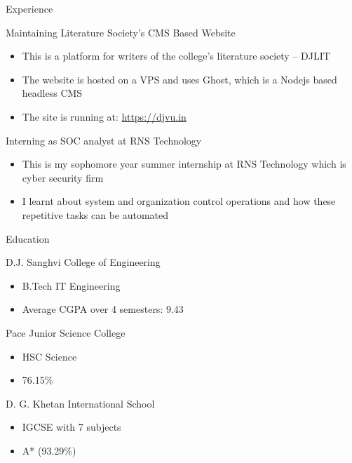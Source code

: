 \documentclass{article}
\newlength{\tabin}
\newlength{\secsep}
\newcommand{\lineunder}{\vspace*{-8pt} \\ \hspace*{-6pt} \hrulefill \\ \vspace*{-15pt}}
\newenvironment{tabbedsection}[1]{
	\begin{list}{}{
		\setlength{\itemsep}{0pt}
		\setlength{\labelsep}{0pt}
		\setlength{\labelwidth}{0pt}
		\setlength{\leftmargin}{\tabin}
		\setlength{\rightmargin}{\tabin}
		\setlength{\listparindent}{0pt}
		\setlength{\parsep}{0pt}
		\setlength{\parskip}{0pt}
		\setlength{\partopsep}{0pt}
		\setlength{\topsep}{#1}
	}
	\item[]
}{\end{list}}
\newenvironment{resume_section}[1]{
	\filbreak
	\vspace{2\secsep}
	\textsc{\large#1}
	\lineunder
	\begin{tabbedsection}{\secsep}
}{\end{tabbedsection}}
\newenvironment{resume_subsection}[2][]{
	\textbf{#2} \hfill {\footnotesize #1} \hspace{2em}
	\begin{tabbedsection}{0.5\secsep}
}{\end{tabbedsection}}
\newenvironment{subitems}{
	\renewcommand{\labelitemi}{-}
	\begin{itemize}
		\setlength{\labelsep}{1em}
}{\end{itemize}}
\begin{document}
\begin{resume_section}{Experience}

	\begin{resume_subsection}{Maintaining Literature Society's CMS Based Website}
		\begin{subitems}
			\item This is a platform for writers of the college's literature society -- DJLIT
			\item The website is hosted on a VPS and uses Ghost, which is a Nodejs based headless CMS
			\item The site is running at: \href{https://djvu.in}{https://djvu.in}
		\end{subitems}
	\end{resume_subsection}

	\begin{resume_subsection}{Interning as SOC analyst at RNS Technology}
		\begin{subitems}
			\item This is my sophomore year summer internship at RNS Technology
			      which is cyber security firm
			\item I learnt about system and organization control operations and
			      how these repetitive tasks can be automated
		\end{subitems}
	\end{resume_subsection}

\end{resume_section}

\begin{resume_section}{Education}

	\begin{resume_subsection}[2019 - 2023 (expected)]{D.J. Sanghvi College of Engineering}
		\begin{subitems}
			\item B.Tech IT Engineering
			\item Average CGPA over 4 semesters: 9.43
		\end{subitems}
	\end{resume_subsection}


	\begin{resume_subsection}[2017 - 2019]{Pace Junior Science College}
		\begin{subitems}
			\item HSC Science
		\item 76.15{\%}
		\end{subitems}
	\end{resume_subsection}

	\begin{resume_subsection}[2017]{D. G. Khetan International School}
		\begin{subitems}
			\item IGCSE with 7 subjects
		\item A* (93.29{\%})
		\end{subitems}
	\end{resume_subsection}

\end{resume_section}

\vspace{1cm}
\end{document}
